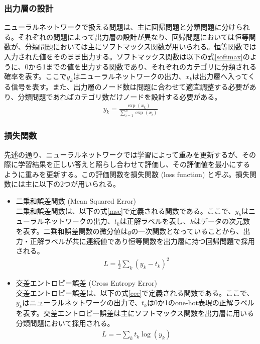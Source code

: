 \subsubsection{出力層の設計}
ニューラルネットワークで扱える問題は、主に回帰問題と分類問題に分けられる。それぞれの問題によって出力層の設計が異なり、回帰問題においては恒等関数が、分類問題においては主にソフトマックス関数が用いられる。恒等関数では入力された値をそのまま出力する。ソフトマックス関数は以下の式\ref{softmax}のように、0から1までの値を出力する関数であり、それぞれのカテゴリに分類される確率を表す。ここで$y_k$はニューラルネットワークの出力、$x_k$は出力層へ入ってくる信号を表す。また、出力層のノード数は問題に合わせて適宜調整する必要があり、分類問題であればカテゴリ数だけノードを設計する必要がある。
\begin{align}
\label{softmax}
y_k = \frac{\exp(x_k)}{\sum_{i=1}^n \exp(x_i)}
\end{align}

\subsubsection{損失関数}
先述の通り、ニューラルネットワークでは学習によって重みを更新するが、その際に学習結果を正しい答えと照らし合わせて評価し、その評価値を最小にするように重みを更新する。この評価関数を損失関数 (loss function) と呼ぶ。損失関数には主に以下の2つが用いられる。
\begin{itemize}
	\item 二乗和誤差関数  (Mean Squared Error) \\
		二乗和誤差関数は、以下の式\ref{mse}で定義される関数である。ここで、$y_k$はニューラルネットワークの出力、$t_k$は正解ラベルを表し、$k$はデータの次元数を表す。二乗和誤差関数の微分値は$y$の一次関数となっていることから、出力・正解ラベルが共に連続値であり恒等関数を出力層に持つ回帰問題で採用される。
		\begin{align}
			\label{mse}
			L = \frac{1}{2}\sum_k {(y_k-t_k)}^2
		\end{align}
	\item 交差エントロピー誤差 (Cross Entropy Error) \\
		交差エントロピー誤差は、以下の式\ref{cee}で定義される関数である。ここで、$y_k$はニューラルネットワークの出力で、$t_k$は0か1のone-hot表現の正解ラベルを表す。交差エントロピー誤差は主にソフトマックス関数を出力層に用いる分類問題において採用される。
		\begin{align}
			\label{cee}
			L = - \sum_k t_k \log(y_k)
		\end{align}
\end{itemize}

